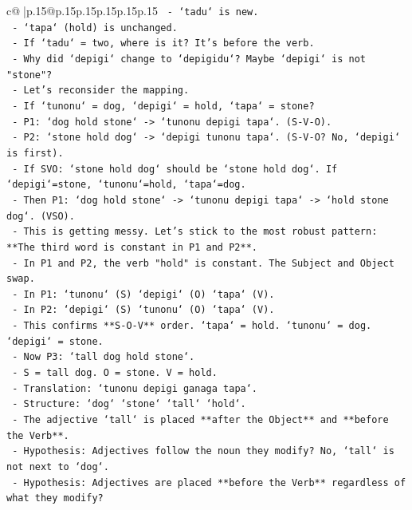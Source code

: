 \documentclass{article}
\begin{document}
{\begin{supertabular}{c@{$\;$}|p{.15\linewidth}@{}p{.15\linewidth}p{.15\linewidth}p{.15\linewidth}p{.15\linewidth}p{.15\linewidth}}
{{{\texttt{   {-} `tadu` is new.} \\
\texttt{   {-} `tapa` (hold) is unchanged.} \\
\texttt{   {-} If `tadu` = two, where is it? It's before the verb.} \\
\texttt{   {-} Why did `depigi` change to `depigidu`? Maybe `depigi` is not "stone"?} \\
\texttt{   {-} Let's reconsider the mapping.} \\
\texttt{   {-} If `tunonu` = dog, `depigi` = hold, `tapa` = stone?} \\
\texttt{     {-} P1: `dog hold stone` {-}> `tunonu depigi tapa`. (S{-}V{-}O).} \\
\texttt{     {-} P2: `stone hold dog` {-}> `depigi tunonu tapa`. (S{-}V{-}O? No, `depigi` is first).} \\
\texttt{     {-} If SVO: `stone hold dog` should be `stone hold dog`. If `depigi`=stone, `tunonu`=hold, `tapa`=dog.} \\
\texttt{     {-} Then P1: `dog hold stone` {-}> `tunonu depigi tapa` {-}> `hold stone dog`. (VSO).} \\
\texttt{     {-} This is getting messy. Let's stick to the most robust pattern: **The third word is constant in P1 and P2**.} \\
\texttt{     {-} In P1 and P2, the verb "hold" is constant. The Subject and Object swap.} \\
\texttt{     {-} In P1: `tunonu` (S) `depigi` (O) `tapa` (V).} \\
\texttt{     {-} In P2: `depigi` (S) `tunonu` (O) `tapa` (V).} \\
\texttt{     {-} This confirms **S{-}O{-}V** order. `tapa` = hold. `tunonu` = dog. `depigi` = stone.} \\
\texttt{   {-} Now P3: `tall dog hold stone`.} \\
\texttt{     {-} S = tall dog. O = stone. V = hold.} \\
\texttt{     {-} Translation: `tunonu depigi ganaga tapa`.} \\
\texttt{     {-} Structure: `dog` `stone` `tall` `hold`.} \\
\texttt{     {-} The adjective `tall` is placed **after the Object** and **before the Verb**.} \\
\texttt{     {-} Hypothesis: Adjectives follow the noun they modify? No, `tall` is not next to `dog`.} \\
\texttt{     {-} Hypothesis: Adjectives are placed **before the Verb** regardless of what they modify?} \\
}}}
\end{supertabular}}
\end{document}
